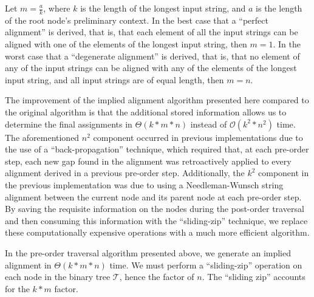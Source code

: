 \documentclass{bmcart}
\begin{document}
%
%

Let $m = \frac{a}{k}$, where $k$ is the length of the longest input string, and $a$ is the length of the root node's preliminary context.
In the best case that a ``perfect alignment'' is derived, that is, that each element of all the input strings can be aligned with one of the elements of the longest input string, then $m = 1$.
In the worst case that a ``degenerate alignment'' is derived, that is, that no element of any of the input strings can be aligned with any of the elements of the longest input string, and all input strings are of equal length, then $m = n$.

The improvement of the implied alignment algorithm presented here compared to the original algorithm is that the additional stored information allows us to determine the final assignments in $\Theta(k * m * n)$ instead of $\mathcal{O}(k^2 * n^2)$ time. 
The aforementioned $n^2$ component occurred in previous implementations due to the use of a ``back-propagation'' technique, which required that, at each pre-order step, each new gap found in the alignment was retroactively applied to every alignment derived in a previous pre-order step.
Additionally, the $k^2$ component in the previous implementation was due to using a Needleman-Wunsch string alignment between the current node and its parent node at each pre-order step.
By saving the requisite information on the nodes during the post-order traversal and then consuming this information with the ``sliding-zip'' technique, we replace these computationally expensive operations with a much more efficient algorithm.

In the pre-order traversal algorithm presented above, we generate an implied alignment in $\Theta(k * m * n)$ time.
We must perform a ``sliding-zip'' operation on each node in the binary tree $\mathcal{T}$, hence the factor of $n$.
The ``sliding zip'' accounts for the $k * m$ factor.
\end{document}
